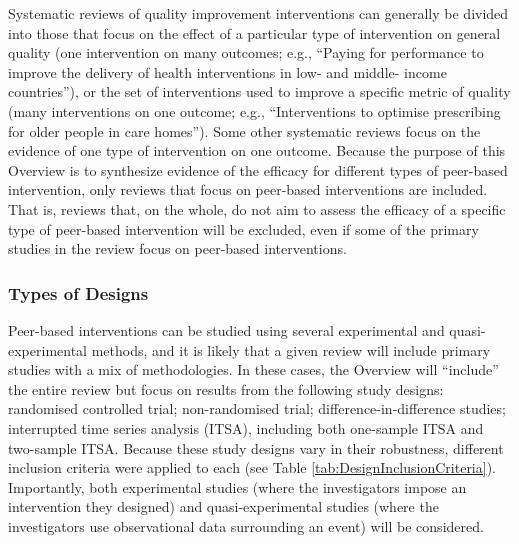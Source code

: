 \documentclass[12pt]{article}
\begin{document}
Systematic reviews of quality improvement interventions can generally be divided into those that focus on the effect of a particular type of intervention on general quality (one intervention on many outcomes; e.g., ``Paying for performance to improve the delivery of health interventions in low- and middle- income countries''), or the set of interventions used to improve a specific metric of quality (many interventions on one outcome; e.g., ``Interventions to optimise prescribing for older people in care homes''). Some other systematic reviews focus on the evidence of one type of intervention on one outcome. Because the purpose of this Overview is to synthesize evidence of the efficacy for different types of peer-based intervention, only reviews that focus on peer-based interventions are included. That is, reviews that, on the whole, do not aim to assess the efficacy of a specific type of peer-based intervention will be excluded, even if some of the primary studies in the review focus on peer-based interventions.


\subsubsection{Types of Designs}

Peer-based interventions can be studied using several experimental and quasi-experimental methods, and it is likely that a given review will include primary studies with a mix of methodologies. In these cases, the Overview will ``include'' the entire review but focus on results from the following study designs: randomised controlled trial; non-randomised trial; difference-in-difference studies; interrupted time series analysis (ITSA), including both one-sample ITSA and two-sample ITSA. Because these study designs vary in their robustness, different inclusion criteria were applied to each (see Table \ref{tab:DesignInclusionCriteria}). Importantly, both experimental studies (where the investigators impose an intervention they designed) and quasi-experimental studies (where the investigators use observational data surrounding an event) will be considered.
\end{document}
